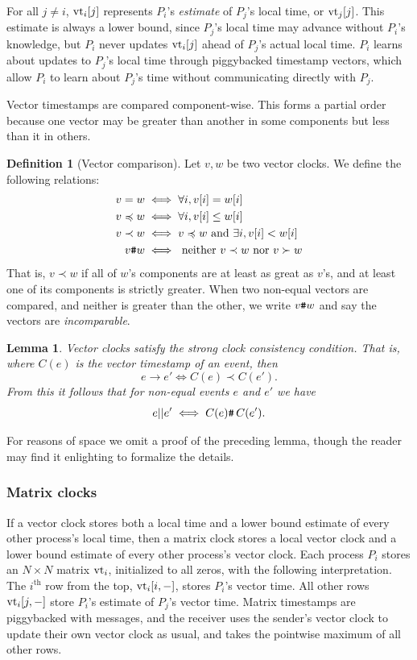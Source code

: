 \documentclass[]             %
{NASA}                       %
\newtheorem{lemma}[theorem]{Lemma}
\theoremstyle{definition}
\newtheorem{definition}[theorem]{Definition}
\begin{document}
For all $j \neq i$, $\textrm{vt}_i[j]$ represents $P_i$'s \emph{estimate} of
$P_j$'s local time, or $\textrm{vt}_j[j]$. This estimate is always a lower
bound, since $P_j$'s local time may advance without $P_i$'s knowledge,
but $P_i$ never updates $\textrm{vt}_i[j]$ ahead of $P_j$'s actual local
time. $P_i$ learns about updates to $P_j$'s local time through
piggybacked timestamp vectors, which allow $P_i$ to learn about
$P_j$'s time without communicating directly with $P_j$.

Vector timestamps are compared component-wise. This forms a partial
order because one vector may be greater than another in some
components but less than it in others.

\begin{definition}[Vector comparison]
  Let $v, w$ be two vector clocks. We define the following relations:
  \begin{align*}
             v = w &\iff \forall i, v[i] = w[i] \\
  v \preccurlyeq w &\iff \forall i, v[i] \leq w[i] \\
         v \prec w &\iff v \preccurlyeq w \textrm{ and } \exists i, v[i] < w[i] \\
            v {\textrm{\texttt{\#}}} w &\iff \textrm{ neither } v \prec w \textrm{ nor } v \succ w
  \end{align*}
  That is, $v \prec w$ if all of $w$'s components are at least as
  great as $v$'s, and at least one of its components is strictly
  greater. When two non-equal vectors are compared, and neither is
  greater than the other, we write $v {\textrm{\texttt{\#}}} w$ and say the vectors
  are \emph{incomparable}.
\end{definition}

\begin{lemma}
  Vector clocks satisfy the strong clock consistency condition. That
  is, where $C(e)$ is the vector timestamp of an event, then
  \[ e \to e' \iff C(e) \prec C(e'). \]
  From this it follows that for non-equal events $e$ and $e'$ we have
  \[e || e' \iff {C(e) \texttt{\#}\,C(e')}. \]%
\end{lemma}

For reasons of space we omit a proof of the preceding lemma, though
the reader may find it enlighting to formalize the details.

\subsubsection{Matrix clocks}
\label{sssec:matrix-clocks}
If a vector clock stores both a local time and a lower bound estimate
of every other process's local time, then a matrix clock stores a
local vector clock and a lower bound estimate of every other process's
vector clock. Each process $P_i$ stores an $N\times{}N$ matrix
$\textrm{vt}_i$, initialized to all zeros, with the following
interpretation. The $i^{\textrm{th}}$ row from the top, $\textrm{vt}_i[i, -]$,
stores $P_i$'s vector time. All other rows $\textrm{vt}_i[j,-]$ store $P_i$'s
estimate of $P_j$'s vector time. Matrix timestamps are piggybacked
with messages, and the receiver uses the sender's vector clock to
update their own vector clock as usual, and takes the pointwise
maximum of all other rows.
\end{document}

